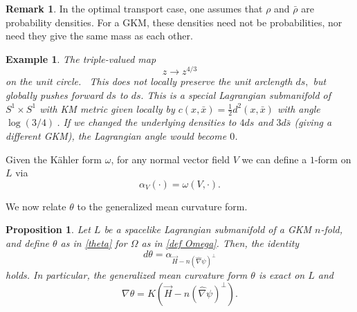\documentclass[12pt,letterpaper]{amsart}%
\newcounter{mycounter}
\numberwithin{mycounter}{section}
\theoremstyle{plain}
\newtheorem{example}{Example}[section]
\newtheorem{proposition}[mycounter]{Proposition}
\numberwithin{equation}{section}
\theoremstyle{definition}
\newtheorem{remark}[mycounter]{Remark}
\begin{document}
\begin{remark}
    In the optimal transport case, one assumes that $\rho$ and $\bar{\rho}$ are probability densities.  For a GKM, these densities need not be probabilities, nor need they give the same mass as each other.
\end{remark}
\begin{example}
    The triple-valued map
\[
z\rightarrow z^{4/3}%
\]
on the unit circle. \ This does not locally preserve the unit arclength $ds,$
but globally pushes forward $ds$ to $ds.$ This is a special Lagrangian
submanifold of $S^1 \times S^1$ with KM metric given locally by $c(x,\bar{x}) = \frac{1}{2}d^2(x,\bar{x})$ with angle $\log(3/4)\ $.  If we changed the underlying densities to $4ds$ and $3d\bar{s}$ (giving a different GKM), the Lagrangian angle would become $0$. 
\end{example} 


Given the K\"ahler form $\omega$, for any normal vector field $V$ we can define a $1$-form on $L$ via 
\[
\alpha_V(\cdot)=\omega(V, \cdot).
\]

We now relate $\theta$ to the generalized mean curvature form.

\begin{proposition}
    Let $L$ be a spacelike Lagrangian submanifold of a GKM $n$-fold, and define $\theta$ as in \eqref{theta} for $\Omega$ as in \eqref{def Omega}. Then, the identity 
    \begin{equation}\label{212}
        d\theta=\alpha_{\vec{H}-n(\hat \nabla\psi)^\perp}
    \end{equation}
    holds. In particular, the generalized mean curvature form $\theta$ is exact on $L$ and 
    \begin{equation}
        \nabla \theta=K \left({\vec{H}-n(\hat \nabla\psi)^\perp}\right).
    \end{equation}

    
\end{proposition}
\end{document}
